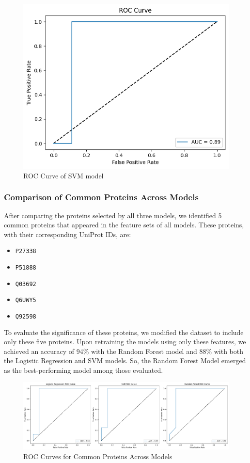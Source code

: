 \documentclass[a4paper,12pt]{article}
\begin{document}
\begin{figure}[H]
\begin{minipage}[b]{0.45\textwidth}
		\includegraphics[width=\textwidth]{images/slr.png}
		\caption{ROC Curve of SVM model}
		\label{fig:roc_svm}
	\end{minipage}
\end{figure}



\subsubsection{Comparison of Common Proteins Across Models}
After comparing the proteins selected by all three models, we identified 5 common proteins that appeared in the feature sets of all models. These proteins, with their corresponding UniProt IDs, are:
\begin{itemize}
	\item \texttt{P27338}
	\item \texttt{P51888}
	\item \texttt{Q03692}
	\item \texttt{Q6UWY5}
	\item \texttt{Q92598}
\end{itemize}

To evaluate the significance of these proteins, we modified the dataset to include only these five proteins. Upon retraining the models using only these features, we achieved an accuracy of 94\% with the Random Forest model and 88\% with both the Logistic Regression and SVM models. So, the Random Forest Model emerged as the best-performing model among those evaluated.

\begin{figure}[h]
	\centering
	\includegraphics[width=1\textwidth]{images/top5_combined.png}
	\caption{ROC Curves for Common Proteins Across Models}
	\label{fig:top5_combined}
\end{figure}
\end{document}
